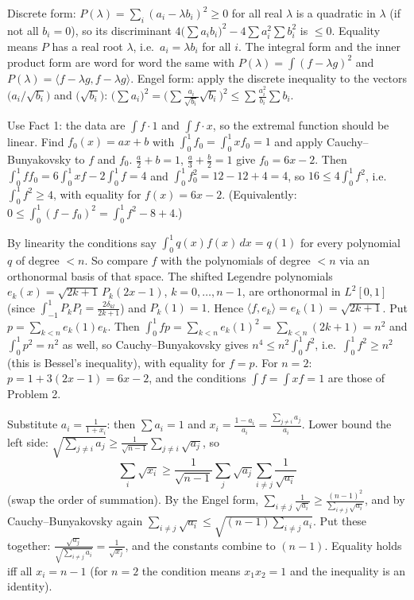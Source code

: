 \documentclass[11pt,a4paper]{article}
\begin{document}

 Discrete form: $P(\lambda)=\sum_i(a_i-\lambda b_i)^2\ge0$ for all real $\lambda$ is a quadratic in $\lambda$ (if not all $b_i=0$), so its discriminant $4\big(\sum a_ib_i\big)^2-4\sum a_i^2\sum b_i^2$ is $\le0$. Equality means $P$ has a real root $\lambda$, i.e.\ $a_i=\lambda b_i$ for all $i$.
 The integral form and the inner product form are word for word the same with $P(\lambda)=\int(f-\lambda g)^2$ and $P(\lambda)=\langle f-\lambda g,f-\lambda g\rangle$.
 Engel form: apply the discrete inequality to the vectors $\big(a_i/\sqrt{b_i}\big)$ and $\big(\sqrt{b_i}\big)$: $\big(\sum a_i\big)^2=\big(\sum\frac{a_i}{\sqrt{b_i}}\sqrt{b_i}\big)^2\le\sum\frac{a_i^2}{b_i}\sum b_i$.

 Use Fact 1: the data are $\int f\cdot1$ and $\int f\cdot x$, so the extremal function should be linear. Find $f_0(x)=ax+b$ with $\int_0^1f_0=\int_0^1xf_0=1$ and apply Cauchy--Bunyakovsky to $f$ and $f_0$.
 $\frac a2+b=1$, $\frac a3+\frac b2=1$ give $f_0=6x-2$. Then $\int_0^1ff_0=6\int_0^1xf-2\int_0^1f=4$ and $\int_0^1f_0^2=12-12+4=4$, so $16\le4\int_0^1f^2$, i.e.\ $\int_0^1f^2\ge4$, with equality for $f(x)=6x-2$. (Equivalently: $0\le\int_0^1(f-f_0)^2=\int_0^1f^2-8+4$.)

 By linearity the conditions say $\int_0^1q(x)f(x)\,dx=q(1)$ for every polynomial $q$ of degree $<n$. So compare $f$ with the polynomials of degree $<n$ via an orthonormal basis of that space.
 The shifted Legendre polynomials $e_k(x)=\sqrt{2k+1}\,P_k(2x-1)$, $k=0,\dots,n-1$, are orthonormal in $L^2[0,1]$ (since $\int_{-1}^1P_kP_l=\frac{2\delta_{kl}}{2k+1}$) and $P_k(1)=1$. Hence $\langle f,e_k\rangle=e_k(1)=\sqrt{2k+1}$.
 Put $p=\sum_{k<n}e_k(1)e_k$. Then $\int_0^1fp=\sum_{k<n}e_k(1)^2=\sum_{k<n}(2k+1)=n^2$ and $\int_0^1p^2=n^2$ as well, so Cauchy--Bunyakovsky gives $n^4\le n^2\int_0^1f^2$, i.e.\ $\int_0^1f^2\ge n^2$ (this is Bessel's inequality), with equality for $f=p$. For $n=2$: $p=1+3(2x-1)=6x-2$, and the conditions $\int f=\int xf=1$ are those of Problem 2.

 Substitute $a_i=\frac1{1+x_i}$: then $\sum a_i=1$ and $x_i=\frac{1-a_i}{a_i}=\frac{\sum_{j\ne i}a_j}{a_i}$.
 Lower bound the left side: $\sqrt{\sum_{j\ne i}a_j}\ge\frac1{\sqrt{n-1}}\sum_{j\ne i}\sqrt{a_j}$, so \[\sum_i\sqrt{x_i}\ge\frac1{\sqrt{n-1}}\sum_j\sqrt{a_j}\sum_{i\ne j}\frac1{\sqrt{a_i}}\] (swap the order of summation).
 By the Engel form, $\sum_{i\ne j}\frac1{\sqrt{a_i}}\ge\frac{(n-1)^2}{\sum_{i\ne j}\sqrt{a_i}}$, and by Cauchy--Bunyakovsky again $\sum_{i\ne j}\sqrt{a_i}\le\sqrt{(n-1)\sum_{i\ne j}a_i}$. Put these together: $\frac{\sqrt{a_j}}{\sqrt{\sum_{i\ne j}a_i}}=\frac1{\sqrt{x_j}}$, and the constants combine to $(n-1)$. Equality holds iff all $x_i=n-1$ (for $n=2$ the condition means $x_1x_2=1$ and the inequality is an identity).
\end{document}
